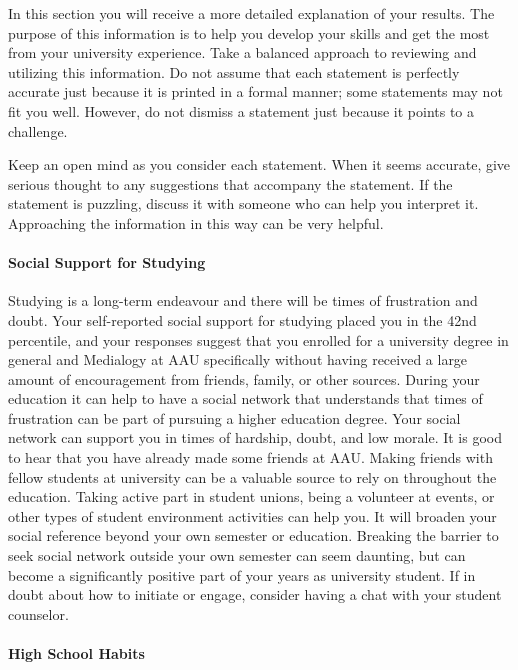 \documentclass[]{article}
\let\oldparagraph\paragraph
\renewcommand{\paragraph}[1]{\oldparagraph{#1}\mbox{}}
\begin{document}
In this section you will receive a more detailed explanation of your
results. The purpose of this information is to help you develop your
skills and get the most from your university experience. Take a balanced
approach to reviewing and utilizing this information. Do not assume that
each statement is perfectly accurate just because it is printed in a
formal manner; some statements may not fit you well. However, do not
dismiss a statement just because it points to a challenge.

Keep an open mind as you consider each statement. When it seems
accurate, give serious thought to any suggestions that accompany the
statement. If the statement is puzzling, discuss it with someone who can
help you interpret it. Approaching the information in this way can be
very helpful.

\paragraph{Social Support for
Studying}\label{social-support-for-studying}

Studying is a long-term endeavour and there will be times of frustration
and doubt. Your self-reported social support for studying placed you in
the 42nd percentile, and your responses suggest that you enrolled for a
university degree in general and Medialogy at AAU specifically without
having received a large amount of encouragement from friends, family, or
other sources. During your education it can help to have a social
network that understands that times of frustration can be part of
pursuing a higher education degree. Your social network can support you
in times of hardship, doubt, and low morale. It is good to hear that you
have already made some friends at AAU. Making friends with fellow
students at university can be a valuable source to rely on throughout
the education. Taking active part in student unions, being a volunteer
at events, or other types of student environment activities can help
you. It will broaden your social reference beyond your own semester or
education. Breaking the barrier to seek social network outside your own
semester can seem daunting, but can become a significantly positive part
of your years as university student. If in doubt about how to initiate
or engage, consider having a chat with your student counselor.

\paragraph{High School Habits}\label{high-school-habits}
\end{document}
